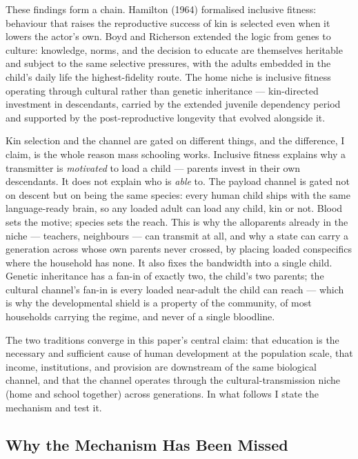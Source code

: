 \documentclass[12pt,letterpaper]{article}
\begin{document}
These findings form a chain. Hamilton (1964) formalised inclusive
fitness: behaviour that raises the reproductive success of kin is
selected even when it lowers the actor's own. Boyd and Richerson
extended the logic from genes to culture: knowledge, norms, and the
decision to educate are themselves heritable and subject to the same
selective pressures, with the adults embedded in the child's daily
life the highest-fidelity route. The home niche is inclusive fitness
operating through cultural rather than genetic inheritance ---
kin-directed investment in descendants, carried by the extended
juvenile dependency period and supported by the post-reproductive
longevity that evolved alongside it.

Kin selection and the channel are gated on different things, and the
difference, I claim, is the whole reason mass schooling works.
Inclusive fitness explains why a transmitter is \emph{motivated} to
load a child --- parents invest in their own descendants. It does not
explain who is \emph{able} to. The payload channel is gated not on
descent but on being the same species: every human child ships with
the same language-ready brain, so any loaded adult can load any
child, kin or not. Blood sets the motive; species sets the reach.
This is why the alloparents already in the niche --- teachers,
neighbours --- can transmit at all, and why a state can carry a
generation across whose own parents never crossed, by placing loaded
conspecifics where the household has none. It also fixes the
bandwidth into a single child. Genetic inheritance has a fan-in of
exactly two, the child's two parents; the cultural channel's fan-in
is every loaded near-adult the child can reach --- which is why the
developmental shield is a property of the community, of most
households carrying the regime, and never of a single bloodline.

The two traditions converge in this paper's central claim: that
education is the necessary and sufficient cause of human development
at the population scale, that income, institutions, and provision
are downstream of the same biological channel, and that the channel
operates through the cultural-transmission niche (home and school
together) across generations. In what follows I state the mechanism
and test it.

\subsection{Why the Mechanism Has Been Missed}\label{why-the-mechanism-has-been-missed}
\end{document}
